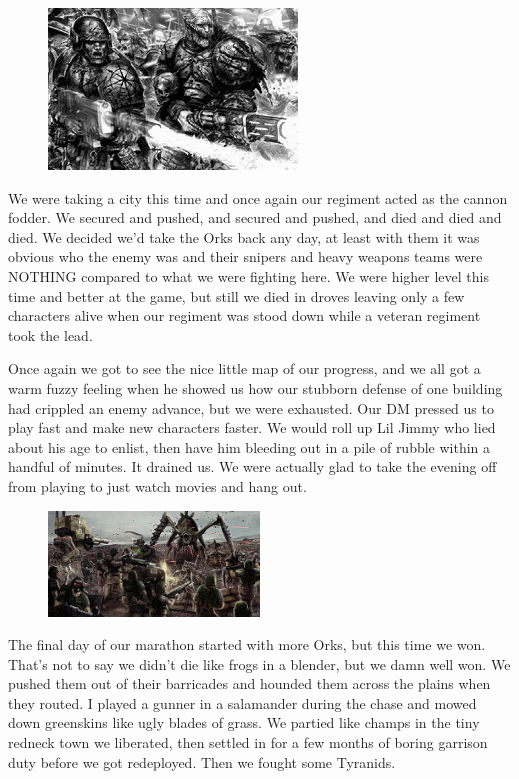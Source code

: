 \begin{figure}
	\begin{center}
		\includegraphics[width=\figwidth]{pics/1/5.png}
	\end{center}
\end{figure}
We were taking a city this time and once again our regiment acted as the cannon fodder.
We secured and pushed, and secured and pushed, and died and died and died.
We decided we'd take the Orks back any day, at least with them it was obvious who the enemy was and their snipers and heavy weapons teams were NOTHING compared to what we were fighting here.
We were higher level this time and better at the game, but still we died in droves leaving only a few characters alive when our regiment was stood down while a veteran regiment took the lead.

Once again we got to see the nice little map of our progress, and we all got a warm fuzzy feeling when he showed us how our stubborn defense of one building had crippled an enemy advance, but we were exhausted.
Our DM pressed us to play fast and make new characters faster. 
We would roll up Lil Jimmy who lied about his age to enlist, then have him bleeding out in a pile of rubble within a handful of minutes. 
It drained us. 
We were actually glad to take the evening off from playing to just watch movies and hang out.

\begin{figure}
	\begin{center}
		\includegraphics[width=0.5\textwidth]{pics/1/6.png}
	\end{center}
\end{figure}
The final day of our marathon started with more Orks, but this time we won. That's not to say we didn't die like frogs in a blender, but we damn well won. We pushed them out of their barricades and hounded them across the plains when they routed. I played a gunner in a salamander during the chase and mowed down greenskins like ugly blades of grass. We partied like champs in the tiny redneck town we liberated, then settled in for a few months of boring garrison duty before we got redeployed. Then we fought some Tyranids.

